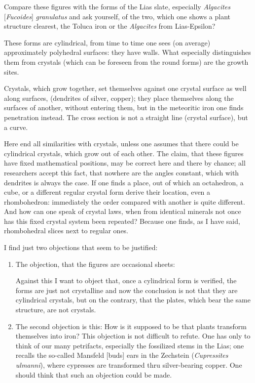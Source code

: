 \documentclass[a4paper, 12pt, oneside]{article}
\begin{document}
Compare these figures with the forms of the Lias slate, especially \emph{Algacites} [\emph{Fucoides}] \emph{granulatus} and ask yourself, of the two, which one shows a plant structure clearest, the Toluca iron or the \emph{Algacites} from Lias-Epsilon?

These forms are cylindrical, from time to time one sees (on average) approximately polyhedral surfaces: they have walls. What especially distinguishes them from crystals (which can be foreseen from the round forms) are the growth sites.

Crystals, which grow together, set themselves against one crystal surface as well along surfaces, (dendrites of silver, copper); they place themselves along the surfaces of another, without entering them, but in the meteoritic iron one finds penetration instead. The cross section is not a straight line (crystal surface), but a curve.

Here end all similarities with crystals, unless one assumes that there could be cylindrical crystals, which grow out of each other. The claim, that these figures have fixed mathematical positions, may be correct here and there by chance; all researchers accept this fact, that nowhere are the angles constant, which with dendrites is always the case. If one finds a place, out of which an octahedron, a cube, or a different regular crystal form derive their location, even a rhombohedron: immediately the order compared with another is quite different. And how can one speak of crystal laws, when from identical minerals not once has this fixed crystal system been repeated? Because one finds, as I have said, rhombohedral slices next to regular ones.

I find just two objections that seem to be justified:
\begin{enumerate}
    \item The objection, that the figures are occasional sheets:
    
    Against this I want to object that, once a cylindrical form is verified, the forms are just not crystalline and now the conclusion is not that they are cylindrical crystals, but on the contrary, that the plates, which bear the same structure, are not crystals.
    \item The second objection is this: How is it supposed to be that plants transform themselves into iron? This objection is not difficult to refute. One has only to think of our many petrifacts, especially the fossilized stems in the Lias; one recalls the so-called Mansfeld [buds] ears in the Zechstein (\emph{Cupressites ulmanni}), where cypresses are transformed thru silver-bearing copper. One should think that such an objection could be made.
\end{enumerate}
\end{document}
